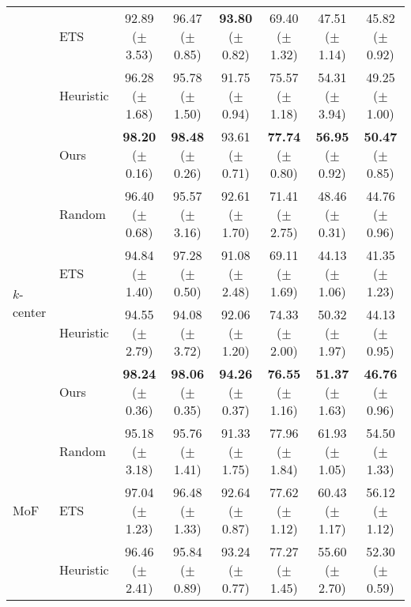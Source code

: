 \begin{table}[t]
{\begin{tabular}{l l c c c c c c}
     & ETS  & 92.89 {\scriptsize ($\pm$ 3.53)} & 96.47 {\scriptsize ($\pm$ 0.85)} & {\bf 93.80} {\scriptsize ($\pm$ 0.82)} & 69.40 {\scriptsize ($\pm$ 1.32)} & 47.51 {\scriptsize ($\pm$ 1.14)} & 45.82 {\scriptsize ($\pm$ 0.92)} \\
     & Heuristic &  96.28 {\scriptsize ($\pm$ 1.68)} &  95.78 {\scriptsize ($\pm$ 1.50)}  & 91.75 {\scriptsize ($\pm$ 0.94)} & 75.57 {\scriptsize ($\pm$ 1.18)} & 54.31 {\scriptsize ($\pm$  3.94)} & 49.25 {\scriptsize ($\pm$ 1.00)} \\
    & Ours & {\bf 98.20} {\scriptsize ($\pm$ 0.16)} & {\bf 98.48} {\scriptsize ($\pm$ 0.26)} &  93.61 {\scriptsize ($\pm$ 0.71)} & {\bf 77.74} {\scriptsize ($\pm$ 0.80)} & {\bf 56.95} {\scriptsize ($\pm$ 0.92)} & {\bf 50.47} {\scriptsize ($\pm$ 0.85)} \\  
    \midrule 
    \multirow{4}{*}{$k$-center} & Random & 96.40 {\scriptsize ($\pm$ 0.68)} & 95.57 {\scriptsize ($\pm$ 3.16)}  & 92.61 {\scriptsize ($\pm$ 1.70)} & 71.41 {\scriptsize ($\pm$ 2.75)} & 48.46 {\scriptsize ($\pm$ 0.31)} & 44.76 {\scriptsize ($\pm$ 0.96)} \\ 
     & ETS  & 94.84 {\scriptsize ($\pm$ 1.40)} & 97.28 {\scriptsize ($\pm$ 0.50)} & 91.08 {\scriptsize ($\pm$ 2.48)} & 69.11 {\scriptsize ($\pm$ 1.69)} & 44.13 {\scriptsize ($\pm$ 1.06)} & 41.35 {\scriptsize ($\pm$ 1.23)} \\
     & Heuristic & 94.55 {\scriptsize ($\pm$ 2.79)} & 94.08 {\scriptsize ($\pm$ 3.72)} & 92.06 {\scriptsize ($\pm$ 1.20)} & 74.33 {\scriptsize ($\pm$ 2.00)} & 50.32 {\scriptsize ($\pm$ 1.97)} & 44.13 {\scriptsize ($\pm$ 0.95)} \\
     & Ours & {\bf 98.24} {\scriptsize ($\pm$ 0.36)} & {\bf 98.06} {\scriptsize ($\pm$ 0.35)} & {\bf 94.26} {\scriptsize ($\pm$ 0.37)} & {\bf 76.55} {\scriptsize ($\pm$ 1.16)} & {\bf 51.37} {\scriptsize ($\pm$ 1.63)} & {\bf 46.76} {\scriptsize ($\pm$ 0.96)}  \\  
    \midrule 
    \multirow{4}{*}{MoF} & Random & 95.18 {\scriptsize ($\pm$ 3.18)} & 95.76 {\scriptsize ($\pm$ 1.41)}  & 91.33 {\scriptsize ($\pm$ 1.75)} & 77.96 {\scriptsize ($\pm$ 1.84)} & 61.93 {\scriptsize ($\pm$ 1.05)} & 54.50 {\scriptsize ($\pm$ 1.33)} \\ 
     & ETS & 97.04 {\scriptsize ($\pm$ 1.23)} & 96.48 {\scriptsize ($\pm$ 1.33)} & 92.64 {\scriptsize ($\pm$ 0.87)} & 77.62 {\scriptsize ($\pm$ 1.12)} & 60.43 {\scriptsize ($\pm$ 1.17)} & 56.12 {\scriptsize ($\pm$ 1.12)} \\
     & Heuristic & 96.46 {\scriptsize ($\pm$ 2.41)} &  95.84 {\scriptsize ($\pm$ 0.89)} & 93.24 {\scriptsize ($\pm$ 0.77)} & 77.27 {\scriptsize ($\pm$ 1.45)} & 55.60 {\scriptsize ($\pm$ 2.70)} & 52.30 {\scriptsize ($\pm$ 0.59)} \\

\end{tabular}}
\end{table}
